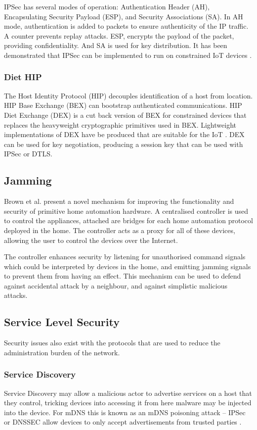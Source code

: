 \documentclass[10pt,journal,compsoc]{IEEEtran}
\begin{document}
IPSec has several modes of operation: Authentication Header (AH), Encapsulating
Security Payload (ESP), and Security Associations (SA). In AH mode,
authentication is added to packets to ensure authenticity of the IP traffic. A
counter prevents replay attacks. ESP, encrypts the payload of the packet,
providing confidentiality. And SA is used for key distribution. It has been
demonstrated that IPSec can be implemented to run on constrained IoT devices
\cite{Rubertis2013}.  

\subsubsection{Diet HIP}
The Host Identity Protocol (HIP) decouples identification of a host from
location. HIP Base Exchange (BEX) can bootstrap authenticated communications.
HIP Diet Exchange (DEX) is a cut back version of BEX for constrained devices
that replaces the heavyweight cryptographic primitives used in BEX. Lightweight
implementations of DEX have be produced that are suitable for the IoT
\cite{Meca2013}. DEX can be used for key negotiation, producing a session key
that can be used with IPSec or DTLS. 

\subsection{Jamming}
Brown et al. \cite{Brown2013} present a novel mechanism for improving the
functionality and security of primitive home automation hardware. A centralised
controller is used to control the appliances, attached are bridges for each
home automation protocol deployed in the home. The controller acts as a proxy
for all of these devices, allowing the user to control the devices over the
Internet. 

The controller enhances security by listening for unauthorised command signals
which could be interpreted by devices in the home, and emitting jamming signals
to prevent them from having an effect. This mechanism can be used to defend
against accidental attack by a neighbour, and against simplistic malicious
attacks. 

\subsection{Service Level Security}
Security issues also exist with the protocols that are used to reduce the
administration burden of the network. 

\subsubsection{Service Discovery}
Service Discovery may allow a malicious actor to advertise services on a host
that they control, tricking devices into accessing it from here malware may be
injected into the device. For mDNS this is known as an mDNS poisoning attack --
IPSec or DNSSEC allow devices to only accept advertisements from trusted
parties \cite{Cheshire2013}. 
\end{document}
